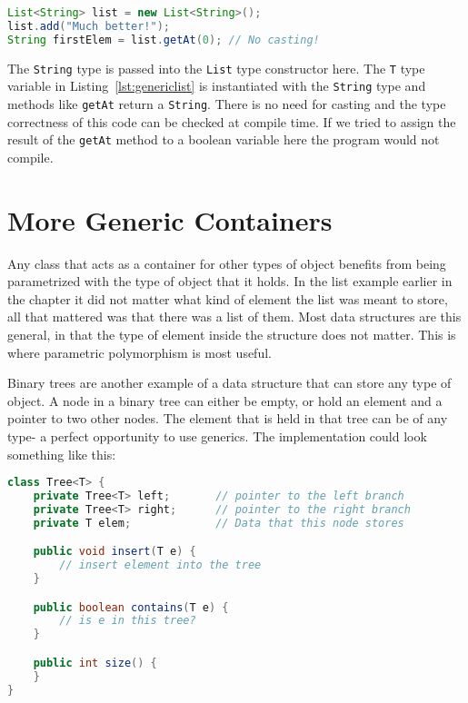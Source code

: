 \begin{lstlisting}[nolol, language=Java, label={lst:listuse}]
List<String> list = new List<String>();
list.add("Much better!");
String firstElem = list.getAt(0); // No casting!
\end{lstlisting}

The \lstinline{String} type is passed into the \lstinline{List} type
constructor here. The \lstinline{T} type variable in
Listing~\ref{lst:genericlist} is instantiated with the \lstinline{String} type
and methods like \lstinline{getAt} return a \lstinline{String}. There is no
need for casting and the type correctness of this code can be checked at
compile time. If we tried to assign the result of the \lstinline{getAt} method
to a boolean variable here the program would not compile.

\section{More Generic Containers}
Any class that acts as a container for other types of object benefits from
being parametrized with the type of object that it holds. In the list example
earlier in the chapter it did not matter what kind of element the list was
meant to store, all that mattered was that there was a list of them. Most data
structures are this general, in that the type of element inside the structure
does not matter. This is where parametric polymorphism is most useful.

Binary trees are another example of a data structure that can store any type of
object. A node in a binary tree can either be empty, or hold an element and a
pointer to two other nodes. The element that is held in that tree can be of any
type- a perfect opportunity to use generics. The implementation could look
something like this:

\begin{lstlisting}[caption={Binary tree with generics}, language=Java, label={lst:generictree}]
class Tree<T> {
    private Tree<T> left;       // pointer to the left branch
    private Tree<T> right;      // pointer to the right branch
    private T elem;             // Data that this node stores

    public void insert(T e) {
        // insert element into the tree
    }

    public boolean contains(T e) {
        // is e in this tree?
    }

    public int size() {
    }
}
\end{lstlisting}

